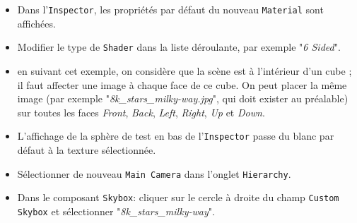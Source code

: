 \documentclass[a4paper,10pt]{article}
\newenvironment{solution}%
{\begin{tcolorbox}[breakable,colback=red!5!white,colframe=red!75!black,title=Solution]}%
{\end{tcolorbox}}
\begin{document}
\begin{solution}
\begin{itemize}
	\item Dans l'\texttt{Inspector}, les propriétés par défaut du nouveau \texttt{Material} sont affichées.
	
	\item Modifier le type de \texttt{Shader} dans la liste déroulante, par exemple "\textit{6 Sided}".
	
	\item[$\rightarrow$] en suivant cet exemple, on considère que la scène est à l'intérieur d'un cube ; il faut affecter une image à chaque face de ce cube. On peut placer la même image  (par exemple "\textit{8k\_stars\_milky-way.jpg}", qui doit exister au préalable) sur toutes les faces \textit{Front}, \textit{Back}, \textit{Left}, \textit{Right}, \textit{Up} et \textit{Down}.
	
	\item L'affichage de la sphère de test en bas de l'\texttt{Inspector} passe du blanc par défaut à la texture sélectionnée.
	
	\item Sélectionner de nouveau \texttt{Main Camera} dans l'onglet \texttt{Hierarchy}.
	
	\item Dans le composant \texttt{Skybox}: cliquer sur le cercle à droite du champ \texttt{Custom Skybox} et sélectionner "\textit{8k\_stars\_milky-way}".  
	
\end{itemize}
\end{solution}
\fi 
\end{document}
